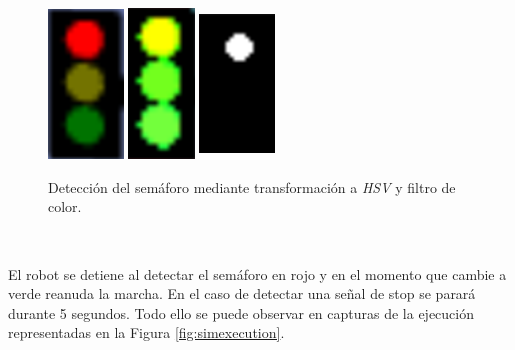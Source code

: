 \begin{figure} [h!]
	\begin{center}
		\includegraphics[width=2cm, height=4cm]{figs/cropped}\hspace{2cm}\includegraphics[width=2cm, height=4cm]{figs/hsv}\hspace{2cm}\includegraphics[width=2cm, height=4cm]{figs/mask}
	\end{center}
	\caption{Detección del semáforo mediante transformación a \textit{HSV} y filtro de color.}
	\label{fig:detector}
\end{figure}\

El robot se detiene al detectar el semáforo en rojo y en el momento que cambie a verde reanuda la marcha. En el caso de detectar una señal de stop se parará durante 5 segundos. Todo ello se puede observar en capturas de la ejecución representadas en la Figura \ref{fig:simexecution}.\\

